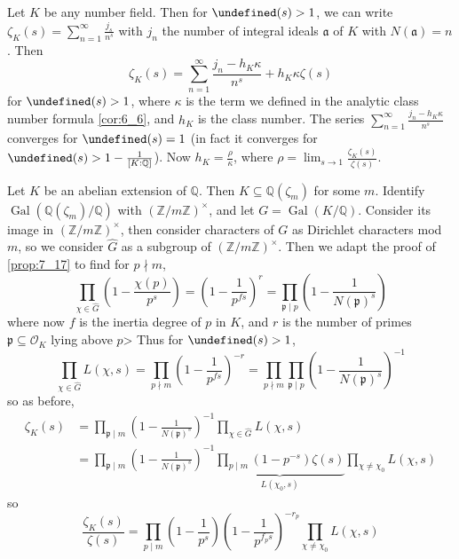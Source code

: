 \documentclass[11pt]{article}
\theoremstyle{definition}
\theoremstyle{plain}
\theoremstyle{remark}
\let\Re\undefined
\DeclareMathOperator{\Re}{Re}
\DeclareMathOperator{\Gal}{Gal}
\newcommand{\ZZ}{\mathbb{Z}}
\newcommand{\QQ}{\mathbb{Q}}
\newcommand{\cO}{\mathcal{O}}
\newcommand{\fa}{\mathfrak{a}}
\newcommand{\fp}{\mathfrak{p}}
\begin{document}
Let $K$ be any number field. Then for $\Re(s) > 1$, we can write $\zeta_K(s) = \sum_{n=1}^\infty \frac{j_s}{n^s}$ with $j_n$ the number of integral ideals $\fa$ of $K$ with $N(\fa) = n$. Then
\begin{equation*}
    \zeta_K(s) = \sum_{n=1}^\infty \frac{j_n - h_K \kappa}{n^s} + h_K \kappa \zeta(s)
\end{equation*}%
for $\Re(s) > 1$, where $\kappa$ is the term we defined in the analytic class number formula \autoref{cor:6_6}, and $h_K$ is the class number. The series $\sum_{n=1}^\infty \frac{j_n - h_K \kappa}{n^s}$ converges for $\Re(s) = 1$ (in fact it converges for $\Re(s) > 1 - \frac{1}{[K : \QQ]}$). Now $h_K = \frac{\rho}{\kappa}$, where $\rho = \lim_{s \to 1} \frac{\zeta_K(s)}{\zeta(s)}$.

Let $K$ be an abelian extension of $\QQ$. Then $K \subseteq \QQ(\zeta_m)$ for some $m$. Identify $\Gal(\QQ(\zeta_m) / \QQ)$ with $(\ZZ / m\ZZ)^\times$, and let $G = \Gal(K / \QQ)$. Consider its image in $(\ZZ / m\ZZ)^\times$, then consider characters of $G$ as Dirichlet characters mod $m$, so we consider $\widehat{G}$ as a subgroup of $(\ZZ / m\ZZ)^\times$. Then we adapt the proof of \autoref{prop:7_17} to find for $p \nmid m$,
\begin{equation*}
    \prod_{\chi \in \widehat{G}} \left(1 - \frac{\chi(p)}{p^s}\right) = \left(1 - \frac{1}{p^{fs}}\right)^r = \prod_{\fp \mid p} \left(1 - \frac{1}{N(\fp)^s}\right)
\end{equation*}
where now $f$ is the inertia degree of $p$ in $K$, and $r$ is the number of primes $\fp \subseteq \cO_K$ lying above $p$> Thus for $\Re(s) > 1$,
\begin{equation*}
    \prod_{\chi \in \widehat{G}} L(\chi, s) = \prod_{p \nmid m} \left(1 - \frac{1}{p^{fs}}\right)^{-r} = \prod_{p \nmid m} \prod_{\fp \mid p} \left(1 - \frac{1}{N(\fp)^s}\right)^{-1}
\end{equation*}
so as before,
\begin{align*}
    \zeta_K(s)
    &= \prod_{\fp \mid m} \left(1 - \frac{1}{N(\fp)^s}\right)^{-1} \prod_{\chi \in \widehat{G}} L(\chi, s)\\
    &= \prod_{\fp \mid m} \left(1 - \frac{1}{N(\fp)^s}\right)^{-1} \underbrace{\prod_{p \mid m} (1-p^{-s}) \zeta(s)}_{L(\chi_0, s)} \prod_{\chi \neq \chi_0} L(\chi, s)
\end{align*}
so
\begin{equation*}
    \frac{\zeta_K(s)}{\zeta(s)} = \prod_{p \mid m} \left(1-\frac{1}{p^s}\right) \left(1-\frac{1}{p^{f_p s}}\right)^{-r_p} \prod_{\chi \neq \chi_0} L(\chi, s)
\end{equation*}
\end{document}
